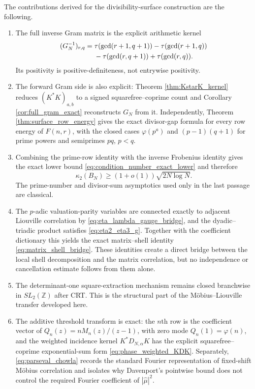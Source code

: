 \documentclass[11pt]{amsart}
\numberwithin{equation}{section}
\theoremstyle{plain}
\theoremstyle{definition}
\theoremstyle{remark}
\newcommand{\Z}{\mathbb Z}
\newcommand{\mob}{\mu}
\begin{document}
The contributions derived for the divisibility-surface construction are the following.
\begin{enumerate}[label=(\roman*)]
\item The full inverse Gram matrix is the explicit arithmetic kernel
\begin{align}
(G_N^{-1})_{r,q}
={}&\tau(\gcd(r+1,q+1))-\tau(\gcd(r+1,q))\notag\\
&-\tau(\gcd(r,q+1))+\tau(\gcd(r,q)).
\label{eq:conclusion_gram_gcd}
\end{align}
Its positivity is positive-definiteness, not entrywise positivity.

\item The forward Gram side is also explicit: Theorem \ref{thm:KstarK_kernel} reduces $(K^*K)_{a,b}$ to a signed squarefree--coprime count and Corollary \ref{cor:full_gram_exact} reconstructs $G_N$ from it.  Independently, Theorem \ref{thm:surface_row_energy} gives the exact divisor-gap formula for every row energy of $F(n,r)$, with the closed cases $\varphi(p^a)$ and $(p-1)(q+1)$ for prime powers and semiprimes $pq$, $p<q$.

\item Combining the prime-row identity with the inverse Frobenius identity gives the exact lower bound \eqref{eq:condition_number_exact_lower} and therefore
\begin{equation}
\kappa_2(B_N)\ge(1+o(1))\sqrt{2N\log N}.
\label{eq:conclusion_condition_number}
\end{equation}
The prime-number and divisor-sum asymptotics used only in the last passage are classical.

\item The $p$-adic valuation-parity variables are connected exactly to adjacent Liouville correlation by \eqref{eq:eta_lambda_gauge_bridge}, and the dyadic--triadic product satisfies \eqref{eq:eta2_eta3_g}.  Together with the coefficient dictionary this yields the exact matrix--shell identity \eqref{eq:matrix_shell_bridge}.  These identities create a direct bridge between the local shell decomposition and the matrix correlation, but no independence or cancellation estimate follows from them alone.

\item The determinant-one square-extraction mechanism remains closed branchwise in $SL_2(\Z)$ after CRT.  This is the structural part of the Möbius--Liouville transfer developed here.

\item The additive threshold transform is exact: the $n$th row is the coefficient vector of $Q_n(z)=nM_n(z)/(z-1)$, with zero mode $Q_n(1)=\varphi(n)$, and the weighted incidence kernel $K^*D_{N,\alpha}K$ has the explicit squarefree--coprime exponential-sum form \eqref{eq:phase_weighted_KDK}.  Separately, \eqref{eq:parseval_chowla} records the standard Fourier representation of fixed-shift Möbius correlation and isolates why Davenport's pointwise bound does not control the required Fourier coefficient of $|\widehat\mob|^2$.

\end{enumerate}
\end{document}
